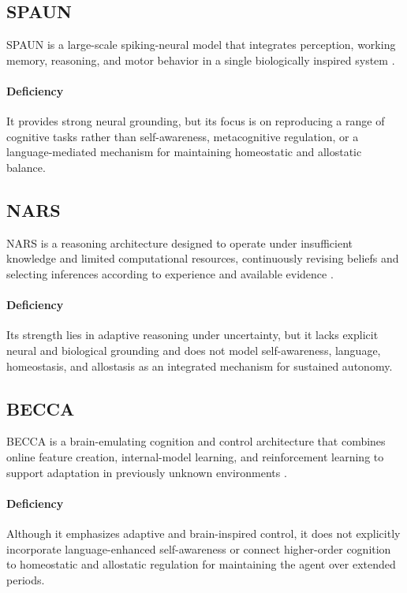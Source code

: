 \documentclass[a4paper]{article}
\begin{document}
      \subsection{SPAUN}
      SPAUN is a large-scale spiking-neural model that integrates perception, working memory, reasoning, and motor behavior in a single biologically inspired system \cite{eliasmith-2012-a-large-scale-model-of-the-functioning-brain}.

      \paragraph{Deficiency}
      It provides strong neural grounding, but its focus is on reproducing a range of cognitive tasks rather than self-awareness, metacognitive regulation, or a language-mediated mechanism for maintaining homeostatic and allostatic balance.

      \subsection{NARS}
      NARS is a reasoning architecture designed to operate under insufficient knowledge and limited computational resources, continuously revising beliefs and selecting inferences according to experience and available evidence \cite{wang-2006-rigid-flexibility-the-logic-of-intelligence}.

      \paragraph{Deficiency}
      Its strength lies in adaptive reasoning under uncertainty, but it lacks explicit neural and biological grounding and does not model self-awareness, language, homeostasis, and allostasis as an integrated mechanism for sustained autonomy.

      \subsection{BECCA}
      BECCA is a brain-emulating cognition and control architecture that combines online feature creation, internal-model learning, and reinforcement learning to support adaptation in previously unknown environments \cite{rohrer-2011-an-implemented-architecture-for-feature-creation-and-general-reinforcement-learning}.

      \paragraph{Deficiency}
      Although it emphasizes adaptive and brain-inspired control, it does not explicitly incorporate language-enhanced self-awareness or connect higher-order cognition to homeostatic and allostatic regulation for maintaining the agent over extended periods.

      
      
\end{document}
